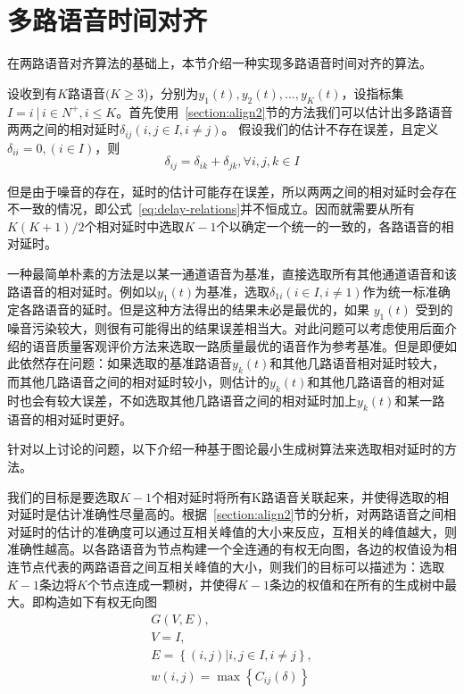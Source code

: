 \section{多路语音时间对齐}

在两路语音对齐算法的基础上，本节介绍一种实现多路语音时间对齐的算法。

设收到有$K$路语音$(K\geq3$)，分别为$y_1(t), y_2(t), ..., y_K(t)$，设指标集$I={i│i\in N^+, i\leq K}$。首先使用~\ref{section:align2}节的方法我们可以估计出多路语音两两之间的相对延时$\delta_{ij}  (i,j\in I,i\neq j)$。
假设我们的估计不存在误差，且定义$\delta_{ii}=0,(i \in I)$，则
\begin{equation}\label{eq:delay-relations}
\delta_{ij}=\delta_{ik}+\delta_{jk}, \forall i,j,k \in I
\end{equation}

但是由于噪音的存在，延时的估计可能存在误差，所以两两之间的相对延时会存在不一致的情况，即公式~\ref{eq:delay-relations}并不恒成立。因而就需要从所有$K(K+1)/2$个相对延时中选取$K-1$个以确定一个统一的一致的，各路语音的相对延时。

一种最简单朴素的方法是以某一通道语音为基准，直接选取所有其他通道语音和该路语音的相对延时。例如以$y_1 (t)$为基准，选取$\delta_{1i}  (i \in I, i \neq 1)$作为统一标准确定各路语音的延时。但是这种方法得出的结果未必是最优的，如果 $y_1 (t)$ 受到的噪音污染较大，则很有可能得出的结果误差相当大。对此问题可以考虑使用后面介绍的语音质量客观评价方法来选取一路质量最优的语音作为参考基准。但是即便如此依然存在问题：如果选取的基准路语音$y_k (t)$和其他几路语音相对延时较大，而其他几路语音之间的相对延时较小，则估计的$y_k (t)$和其他几路语音的相对延时也会有较大误差，不如选取其他几路语音之间的相对延时加上$y_k (t)$和某一路语音的相对延时更好。

针对以上讨论的问题，以下介绍一种基于图论最小生成树算法来选取相对延时的方法。

我们的目标是要选取$K-1$个相对延时将所有K路语音关联起来，并使得选取的相对延时是估计准确性尽量高的。根据~\ref{section:align2}节的分析，对两路语音之间相对延时的估计的准确度可以通过互相关峰值的大小来反应，互相关的峰值越大，则准确性越高。以各路语音为节点构建一个全连通的有权无向图，各边的权值设为相连节点代表的两路语音之间互相关峰值的大小，则我们的目标可以描述为：选取$K-1$条边将$K$个节点连成一颗树，并使得$K-1$条边的权值和在所有的生成树中最大。即构造如下有权无向图
\begin{equation}
\begin{array}{l}
G(V,E), \\
V = I, \\
E = \left\{(i,j)|i, j\in I, i \neq j\right\}, \\
w(i,j)=\max⁡ \left\{ C_{ij}(\delta) \right\}
\end{array}
\end{equation}

